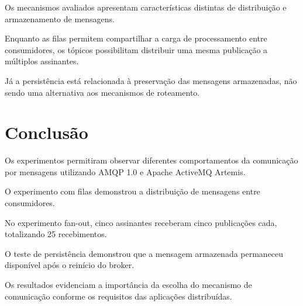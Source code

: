 \documentclass[12pt,a4paper]{article}
\begin{document}
Os mecanismos avaliados apresentam
características distintas de distribuição
e armazenamento de mensagens.

Enquanto as filas permitem compartilhar
a carga de processamento entre consumidores,
os tópicos possibilitam distribuir uma
mesma publicação a múltiplos assinantes.

Já a persistência está relacionada
à preservação das mensagens armazenadas,
não sendo uma alternativa aos mecanismos
de roteamento.

\section{Conclusão}

Os experimentos permitiram observar
diferentes comportamentos da comunicação
por mensagens utilizando AMQP 1.0
e Apache ActiveMQ Artemis.

O experimento com filas demonstrou a
distribuição de mensagens entre consumidores.

No experimento fan-out, cinco assinantes
receberam cinco publicações cada,
totalizando 25 recebimentos.

O teste de persistência demonstrou que
a mensagem armazenada permaneceu disponível
após o reinício do broker.

Os resultados evidenciam a importância
da escolha do mecanismo de comunicação
conforme os requisitos das aplicações
distribuídas.

\newpage



\end{document}
